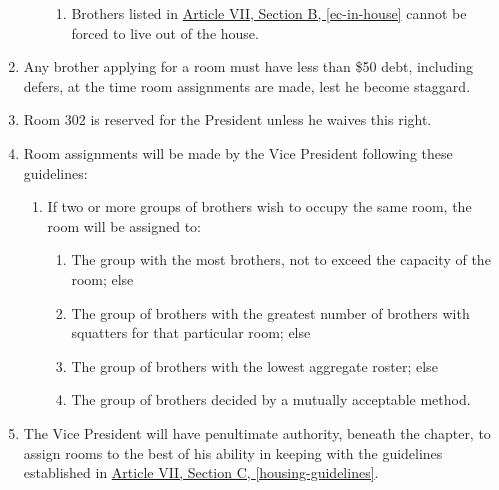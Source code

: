 \begin{enumerate}
\begin{enumerate}
\begin{enumerate}
						\item Brothers listed in \hyperref[ec-in-house]{Article VII, Section B, \autoref*{ec-in-house}} cannot be forced to live out of the house.
					\end{enumerate}
			\end{enumerate}

		\item Any brother applying for a room must have less than \$50 debt, including \glspl{defer}, at the time room assignments are made, lest he become \gls{staggard}.

		\item Room 302 is reserved for the President unless he waives this right.

		\item Room assignments will be made by the Vice President following these guidelines: \label{housing-guidelines}
			\begin{enumerate}
				\item If two or more groups of brothers wish to occupy the same room, the room will be assigned to:

					\begin{enumerate}
						\item The group with the most brothers, not to exceed the capacity of the room; else
						\item The group of brothers with the greatest number of brothers with \gls{squatters} for that particular room; else
						\item The group of brothers with the lowest aggregate \gls{roster}; else
						\item The group of brothers decided by a mutually acceptable method.
					\end{enumerate}
			\end{enumerate}

		\item The Vice President will have penultimate authority, beneath the chapter, to assign rooms to the best of his ability in keeping with the guidelines established in \hyperref[housing-guidelines]{Article VII, Section C, \autoref*{housing-guidelines}}.

	\end{enumerate}
